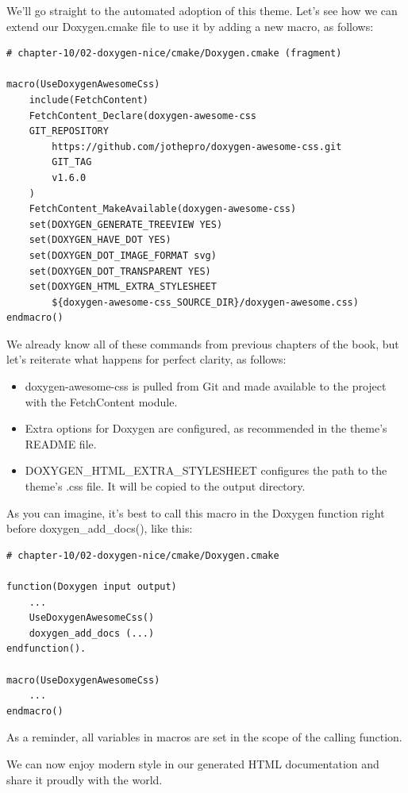 We'll go straight to the automated adoption of this theme. Let's see how we can extend our Doxygen.cmake file to use it by adding a new macro, as follows:

\begin{lstlisting}[style=styleCMake]
# chapter-10/02-doxygen-nice/cmake/Doxygen.cmake (fragment)

macro(UseDoxygenAwesomeCss)
	include(FetchContent)
	FetchContent_Declare(doxygen-awesome-css
	GIT_REPOSITORY
		https://github.com/jothepro/doxygen-awesome-css.git
		GIT_TAG
		v1.6.0
	)
	FetchContent_MakeAvailable(doxygen-awesome-css)
	set(DOXYGEN_GENERATE_TREEVIEW YES)
	set(DOXYGEN_HAVE_DOT YES)
	set(DOXYGEN_DOT_IMAGE_FORMAT svg)
	set(DOXYGEN_DOT_TRANSPARENT YES)
	set(DOXYGEN_HTML_EXTRA_STYLESHEET
		${doxygen-awesome-css_SOURCE_DIR}/doxygen-awesome.css)
endmacro()
\end{lstlisting}

We already know all of these commands from previous chapters of the book, but let's reiterate what happens for perfect clarity, as follows:

\begin{itemize}
\item 
doxygen-awesome-css is pulled from Git and made available to the project with the FetchContent module.

\item 
Extra options for Doxygen are configured, as recommended in the theme's README file.

\item 
DOXYGEN\_HTML\_EXTRA\_STYLESHEET configures the path to the theme's .css file. It will be copied to the output directory.
\end{itemize}

As you can imagine, it's best to call this macro in the Doxygen function right before doxygen\_add\_docs(), like this:

\begin{lstlisting}[style=styleCMake]
# chapter-10/02-doxygen-nice/cmake/Doxygen.cmake

function(Doxygen input output)
	...
	UseDoxygenAwesomeCss()
	doxygen_add_docs (...)
endfunction().

macro(UseDoxygenAwesomeCss)
	...
endmacro()
\end{lstlisting}

As a reminder, all variables in macros are set in the scope of the calling function.

We can now enjoy modern style in our generated HTML documentation and share it proudly with the world.















